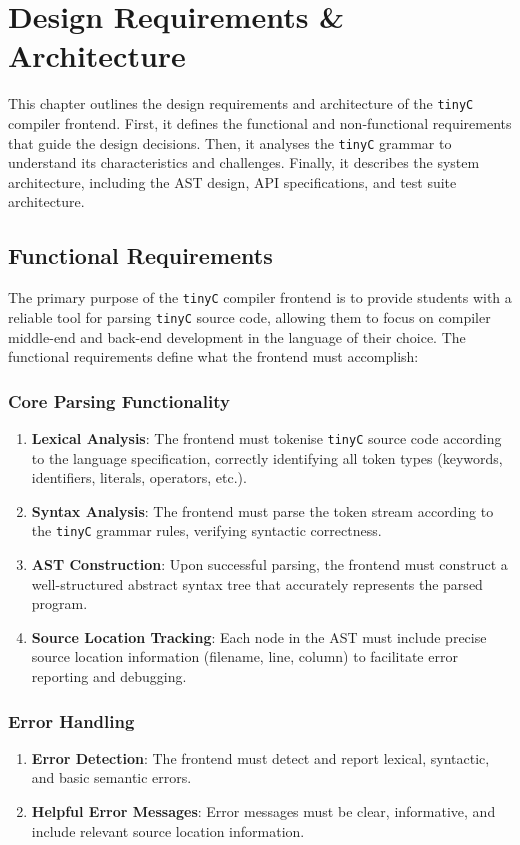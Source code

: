\chapter{Design Requirements \& Architecture}

This chapter outlines the design requirements and architecture of the \texttt{tinyC} compiler frontend. First, it defines the functional and non-functional requirements that guide the design decisions. Then, it analyses the \texttt{tinyC} grammar to understand its characteristics and challenges. Finally, it describes the system architecture, including the AST design, API specifications, and test suite architecture.

\section{Functional Requirements}

The primary purpose of the \texttt{tinyC} compiler frontend is to provide students with a reliable tool for parsing \texttt{tinyC} source code, allowing them to focus on compiler middle-end and back-end development in the language of their choice. The functional requirements define what the frontend must accomplish:

\subsection{Core Parsing Functionality}
\begin{enumerate}
    \item \textbf{Lexical Analysis}: The frontend must tokenise \texttt{tinyC} source code according to the language specification, correctly identifying all token types (keywords, identifiers, literals, operators, etc.).
    \item \textbf{Syntax Analysis}: The frontend must parse the token stream according to the \texttt{tinyC} grammar rules, verifying syntactic correctness.
    \item \textbf{AST Construction}: Upon successful parsing, the frontend must construct a well-structured abstract syntax tree that accurately represents the parsed program.
    \item \textbf{Source Location Tracking}: Each node in the AST must include precise source location information (filename, line, column) to facilitate error reporting and debugging.
\end{enumerate}

\subsection{Error Handling}
\begin{enumerate}
    \item \textbf{Error Detection}: The frontend must detect and report lexical, syntactic, and basic semantic errors.
    \item \textbf{Helpful Error Messages}: Error messages must be clear, informative, and include relevant source location information.
\end{enumerate}


